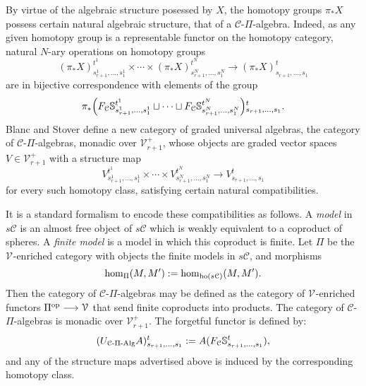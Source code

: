 \documentclass[11pt]{amsart}
\theoremstyle{plain}
\theoremstyle{definition}
\renewcommand{\to}{\longrightarrow}
\newcommand{\calC}{\mathcal{C}}
\newcommand{\calV}{\mathcal{V}}
\newcommand{\calc}{\mathcal{C}}
\theoremstyle{plain}
\newcommand{\vect}[2]{\calV^{#1}_{#2}}
\newcommand{\PiAlg}{\textup{-$\Pi$-Alg}}
\begin{document}
\begin{CPiAlgs and CHalgs}
By virtue of the algebraic structure posessed by $X$, the homotopy groups $\pi_*X$ possess certain natural algebraic structure, that of a $\calc$-$\Pi$-algebra. Indeed, as any given homotopy group is a representable functor on the homotopy category, natural $N$-ary operations on homotopy groups
\[(\pi_*X)_{s_{r+1}^{1},\ldots,s_{1}^{1}}^{t^1}\times\cdots \times(\pi_*X)_{s_{r+1}^{N},\ldots,s_{1}^{N}}^{t^N}\to (\pi_*X)_{s_{r+1},\ldots,s_{1}}^{t}\]
are in bijective correspondence with elements of the group
\[ \pi_*\Bigl(F_\calC\mathbb{S}_{s_{r+1}^{1},\ldots,s_{1}^{1}}^{t^1}\sqcup\cdots\sqcup F_\calC\mathbb{S}_{s_{r+1}^{N},\ldots,s_{1}^{N}}^{t^N}\Bigr)\makebox[0cm][l]{}_{s_{r+1},\ldots,s_{1}}^{t}.\]
Blanc and Stover \cite{Blanc_Stover-Groth_SS.pdf} define a new category of graded universal algebras, the category of $\calC$-$\Pi$-algebras, monadic over $\vect{+}{r+1}$, whose objects are graded vector spaces $V\in\vect{+}{r+1}$ with a structure map 
\[V_{s_{r+1}^{1},\ldots,s_{1}^{1}}^{t^1}\times\cdots \times V_{s_{r+1}^{N},\ldots,s_{1}^{N}}^{t^N}\to V_{s_{r+1},\ldots,s_{1}}^{t}\]
for every such homotopy class, satisfying certain natural compatibilities.

It is a standard formalism to encode these compatibilities as follows. A \emph{model}  \cite{Blanc_Stover-Groth_SS.pdf} in $s\calc$ is an almost free object of $s\calc$ which is weakly equivalent to a coproduct of spheres. A \emph{finite model} is a model in which this coproduct is finite. Let $\Pi$  be the $\vect{}{}$-enriched category with objects the finite models in $s\calc$, and morphisms
\[\hom_{\Pi}(M,M'):=\hom_{\textup{ho}(s\calc)}(M,M').\]
Then the category of $\calc$-$\Pi$-algebras  may be defined as the category of $\vect{}{}$-enriched functors $\Pi^\textup{op}\to \vect{}{}$ that send finite coproducts into products. The category of $\calc$-$\Pi$-algebras is monadic over $\vect{+}{r+1}$. The forgetful functor is defined by:%
\[(U_{\calc\PiAlg}A)^t_{s_{r+1},\ldots,s_1}:=A(F_\calC\mathbb{S}_{s_{r+1},\ldots,s_{1}}^{t}),\]
and any of the structure maps advertised above is induced by the corresponding homotopy class. %


\end{CPiAlgs and CHalgs}
\end{document}
